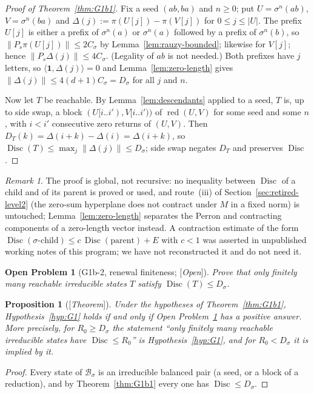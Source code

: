 \documentclass[11pt]{amsart}
\theoremstyle{plain}
\newtheorem{proposition}[theorem]{Proposition}
\newtheorem{problem}[theorem]{Open Problem}
\theoremstyle{definition}
\theoremstyle{remark}
\newtheorem{remark}[theorem]{Remark}
\newcommand{\B}{\mathcal{B}}
\newcommand{\Disc}{\operatorname{Disc}}
\newcommand{\red}{\operatorname{red}}
\newcommand{\Status}[1]{\textup{[\textit{#1}]}}
\begin{document}
\begin{proof}[Proof of Theorem~\ref{thm:G1b1}]
Fix a seed $(ab,ba)$ and $n\ge0$; put $U=\sigma^n(ab)$, $V=\sigma^n(ba)$ and $\Delta(j):=\pi(U[j])-\pi(V[j])$ for $0\le j\le|U|$. The prefix $U[j]$ is either a prefix of $\sigma^n(a)$ or $\sigma^n(a)$ followed by a prefix of $\sigma^n(b)$, so $\|P_s\pi(U[j])\|\le2C_\sigma$ by Lemma~\ref{lem:rauzy-bounded}; likewise for $V[j]$; hence $\|P_s\Delta(j)\|\le4C_\sigma$. (Legality of $ab$ is not needed.) Both prefixes have $j$ letters, so $\langle\mathbf 1,\Delta(j)\rangle=0$ and Lemma~\ref{lem:zero-length} gives $\|\Delta(j)\|\le4(d+1)C_\sigma=D_\sigma$ for all $j$ and $n$.

Now let $T$ be reachable. By Lemma~\ref{lem:descendants} applied to a seed, $T$ is, up to side swap, a block $(U[i..i'),V[i..i'))$ of $\red(U,V)$ for some seed and some $n$, with $i<i'$ consecutive zero returns of $(U,V)$. Then $D_T(k)=\Delta(i+k)-\Delta(i)=\Delta(i+k)$, so $\Disc(T)\le\max_j\|\Delta(j)\|\le D_\sigma$; side swap negates $D_T$ and preserves $\Disc$.
\end{proof}

\begin{remark}\label{rem:no-contraction}
The proof is global, not recursive: no inequality between $\Disc$ of a child and of its parent is proved or used, and route~(iii) of Section~\ref{sec:retired-level2} (the zero-sum hyperplane does not contract under $M$ in a fixed norm) is untouched; Lemma~\ref{lem:zero-length} separates the Perron and contracting components of a zero-length vector instead. A contraction estimate of the form $\Disc(\sigma\text{-child})\le c\,\Disc(\text{parent})+E$ with $c<1$ was asserted in unpublished working notes of this program; we have not reconstructed it and do not need it.
\end{remark}

\begin{problem}[G1b-2, renewal finiteness; \Status{Open}]\label{prob:G1b2}
Prove that only finitely many reachable irreducible states $T$ satisfy $\Disc(T)\le D_\sigma$.
\end{problem}

\begin{proposition}[\Status{Theorem}]\label{lem:G1-assembly}
Under the hypotheses of Theorem~\ref{thm:G1b1}, Hypothesis~\ref{hyp:G1} holds if and only if Open Problem~\ref{prob:G1b2} has a positive answer. More precisely, for $R_0\ge D_\sigma$ the statement ``only finitely many reachable irreducible states have $\Disc\le R_0$'' is Hypothesis~\ref{hyp:G1}, and for $R_0<D_\sigma$ it is implied by it.
\end{proposition}
\begin{proof}
Every state of $\B_\sigma$ is an irreducible balanced pair (a seed, or a block of a reduction), and by Theorem~\ref{thm:G1b1} every one has $\Disc\le D_\sigma$.
\end{proof}
\end{document}
